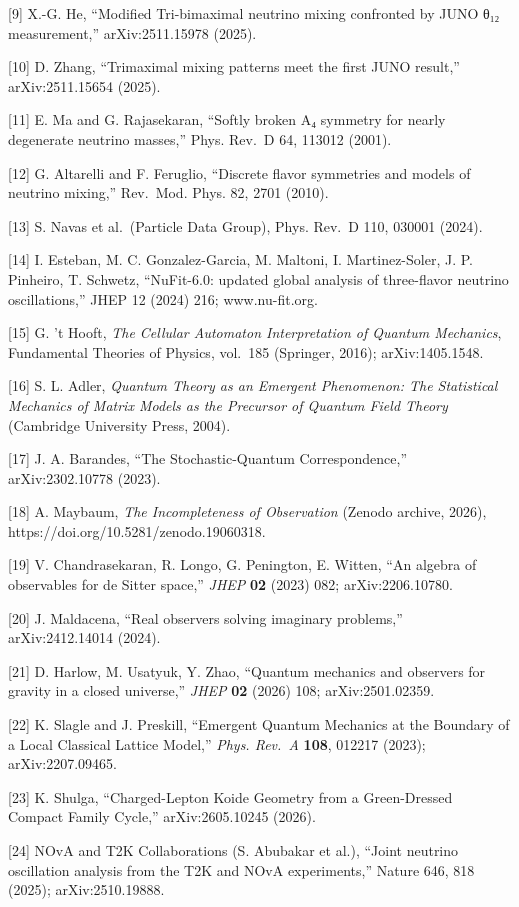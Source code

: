 \documentclass[
]{article}
\begin{document}
{[}9{]} X.-G. He, ``Modified Tri-bimaximal neutrino mixing confronted by
JUNO θ₁₂ measurement,'' arXiv:2511.15978 (2025).

{[}10{]} D. Zhang, ``Trimaximal mixing patterns meet the first JUNO
result,'' arXiv:2511.15654 (2025).

{[}11{]} E. Ma and G. Rajasekaran, ``Softly broken A₄ symmetry for
nearly degenerate neutrino masses,'' Phys. Rev.~D 64, 113012 (2001).

{[}12{]} G. Altarelli and F. Feruglio, ``Discrete flavor symmetries and
models of neutrino mixing,'' Rev.~Mod. Phys. 82, 2701 (2010).

{[}13{]} S. Navas et al.~(Particle Data Group), Phys. Rev.~D 110, 030001
(2024).

{[}14{]} I. Esteban, M. C. Gonzalez-Garcia, M. Maltoni, I.
Martinez-Soler, J. P. Pinheiro, T. Schwetz, ``NuFit-6.0: updated global
analysis of three-flavor neutrino oscillations,'' JHEP 12 (2024) 216;
www.nu-fit.org.

{[}15{]} G. 't Hooft, \emph{The Cellular Automaton Interpretation of
Quantum Mechanics}, Fundamental Theories of Physics, vol.~185 (Springer,
2016); arXiv:1405.1548.

{[}16{]} S. L. Adler, \emph{Quantum Theory as an Emergent Phenomenon:
The Statistical Mechanics of Matrix Models as the Precursor of Quantum
Field Theory} (Cambridge University Press, 2004).

{[}17{]} J. A. Barandes, ``The Stochastic-Quantum Correspondence,''
arXiv:2302.10778 (2023).

{[}18{]} A. Maybaum, \emph{The Incompleteness of Observation} (Zenodo
archive, 2026), https://doi.org/10.5281/zenodo.19060318.

{[}19{]} V. Chandrasekaran, R. Longo, G. Penington, E. Witten, ``An
algebra of observables for de Sitter space,'' \emph{JHEP} \textbf{02}
(2023) 082; arXiv:2206.10780.

{[}20{]} J. Maldacena, ``Real observers solving imaginary problems,''
arXiv:2412.14014 (2024).

{[}21{]} D. Harlow, M. Usatyuk, Y. Zhao, ``Quantum mechanics and
observers for gravity in a closed universe,'' \emph{JHEP} \textbf{02}
(2026) 108; arXiv:2501.02359.

{[}22{]} K. Slagle and J. Preskill, ``Emergent Quantum Mechanics at the
Boundary of a Local Classical Lattice Model,'' \emph{Phys. Rev.~A}
\textbf{108}, 012217 (2023); arXiv:2207.09465.

{[}23{]} K. Shulga, ``Charged-Lepton Koide Geometry from a Green-Dressed
Compact Family Cycle,'' arXiv:2605.10245 (2026).

{[}24{]} NOvA and T2K Collaborations (S. Abubakar et al.), ``Joint
neutrino oscillation analysis from the T2K and NOvA experiments,''
Nature 646, 818 (2025); arXiv:2510.19888.
\end{document}
